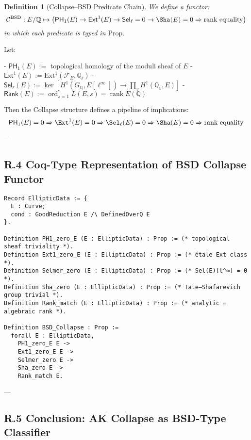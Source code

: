 \documentclass[11pt]{article}
\newtheorem{definition}[theorem]{Definition}
\begin{document}
\begin{definition}[Collapse–BSD Predicate Chain]
We define a functor:
\[
\mathcal{C}^{\mathrm{BSD}} : E/\mathbb{Q} \mapsto \left(
\mathsf{PH}_1(E) \to \mathsf{Ext}^1(E) \to \mathsf{Sel}_\ell = 0 \to \Sha(E) = 0 \Rightarrow \text{rank equality}
\right)
\]
in which each predicate is typed in \( \mathrm{Prop} \).
\end{definition}

Let:

- \( \mathsf{PH}_1(E) := \) topological homology of the moduli sheaf of \( E \)
- \( \mathsf{Ext}^1(E) := \mathrm{Ext}^1(\mathcal{F}_E, \mathbb{Q}_\ell) \)
- \( \mathsf{Sel}_\ell(E) := \ker[ H^1(G_\mathbb{Q}, E[\ell^\infty]) \to \prod_v H^1(\mathbb{Q}_v, E) ] \)
- \( \mathsf{Rank}(E) := \operatorname{ord}_{s=1} L(E,s) = \operatorname{rank} E(\mathbb{Q}) \)

Then the Collapse structure defines a pipeline of implications:
\[
\mathsf{PH}_1(E) = 0 \Rightarrow \Ext^1(E) = 0 \Rightarrow \Sel_\ell(E) = 0 \Rightarrow \Sha(E) = 0 \Rightarrow \text{rank equality}
\]

---

\subsection*{R.4 Coq-Type Representation of BSD Collapse Functor}

\begin{verbatim}
Record EllipticData := {
  E : Curve;
  cond : GoodReduction E /\ DefinedOverQ E
}.

Definition PH1_zero_E (E : EllipticData) : Prop := (* topological sheaf triviality *).
Definition Ext1_zero_E (E : EllipticData) : Prop := (* étale Ext class *).
Definition Selmer_zero (E : EllipticData) : Prop := (* Sel(E)[l^∞] = 0 *).
Definition Sha_zero (E : EllipticData) : Prop := (* Tate–Shafarevich group trivial *).
Definition Rank_match (E : EllipticData) : Prop := (* analytic = algebraic rank *).

Definition BSD_Collapse : Prop :=
  forall E : EllipticData,
    PH1_zero_E E ->
    Ext1_zero_E E ->
    Selmer_zero E ->
    Sha_zero E ->
    Rank_match E.
\end{verbatim}

---

\subsection*{R.5 Conclusion: AK Collapse as BSD-Type Classifier}
\end{document}
